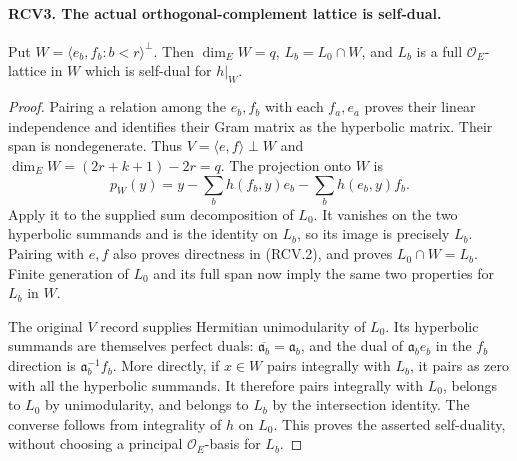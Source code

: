 \documentclass[11pt,a4paper]{article}
\numberwithin{equation}{section}
\theoremstyle{remark}\newtheorem{remark}[theorem]{Remark}
\begin{document}
\paragraph{RCV3. The actual orthogonal-complement lattice is self-dual.}
\label{claim:RCV3}
Put \(W=\langle e_b,f_b:b<r\rangle^\perp\).  Then
\(\dim_E W=q\), \(L_b=L_0\cap W\), and \(L_b\) is a full
\(\mathcal O_E\)-lattice in \(W\) which is self-dual for \(h|_W\).
\begin{proof}
Pairing a relation among the \(e_b,f_b\) with each \(f_a,e_a\)
proves their linear independence and identifies their Gram matrix
as the hyperbolic matrix.  Their span is nondegenerate.  Thus
\(V=\langle e,f\rangle\perp W\) and
\(\dim_E W=(2r+k+1)-2r=q\).  The projection onto \(W\) is
\[
 p_W(y)=y-\sum_b h(f_b,y)e_b-\sum_b h(e_b,y)f_b.
\tag{RCV.5}
\]
Apply it to the supplied sum decomposition of \(L_0\).  It vanishes
on the two hyperbolic summands and is the identity on \(L_b\),
so its image is precisely \(L_b\).  Pairing with \(e,f\) also
proves directness in (RCV.2), and proves \(L_0\cap W=L_b\).
Finite generation of \(L_0\) and its full span now imply the
same two properties for \(L_b\) in \(W\).

The original \(V\) record supplies Hermitian unimodularity of
\(L_0\).  Its hyperbolic summands are themselves perfect duals:
\(\overline{\mathfrak a_b}=\mathfrak a_b\), and the dual of
\(\mathfrak a_b e_b\) in the \(f_b\) direction is
\(\mathfrak a_b^{-1}f_b\).  More directly, if \(x\in W\)
pairs integrally with \(L_b\), it pairs as zero with all the
hyperbolic summands.  It therefore pairs integrally with \(L_0\),
belongs to \(L_0\) by unimodularity, and belongs to \(L_b\) by
the intersection identity.  The converse follows from integrality
of \(h\) on \(L_0\).  This proves the asserted self-duality,
without choosing a principal \(\mathcal O_E\)-basis for \(L_b\).
\end{proof}

\end{document}
